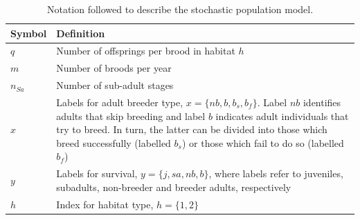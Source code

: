 \begin{table}
\caption[Notation]{Notation followed to describe the stochastic population model.}\label{tab:table3.1}
\begin{tabular}[b]{@{}p{1.5cm}p{13cm}@{}}
\toprule
\textbf{Symbol} & \textbf{Definition}                                                                                                                                                                                                                                                                                        \\ \midrule
$q$   & Number of offsprings per brood in habitat $h$                                                                                                                                                                                                                                                                        \\
$m$   & Number of broods per year                                                                                                                                                                                                                                                                                            \\
${n}_{Sa}$        & Number of sub-adult stages                                                                                                                                                                                                                                                                               \\
$x$   & Labels for adult breeder type, $x= \{nb, b, b_{s}, b_{f}\}$. Label $nb$ identifies adults that skip breeding and label $b$ indicates adult individuals that try to breed. In turn, the latter can be divided into those which breed successfully (labelled $b_{s}$) or those which fail to do so (labelled $b_{f}$)  \\
$y$   & Labels for survival, $y= \{j, sa, nb, b\}$, where labels refer to juveniles, subadults, non-breeder and breeder adults, respectively                                                                                                                                                                                 \\
$h$   & Index for habitat type, $h= \{1, 2\}$                                                                                                                                                                                                                                                                                \\

\end{tabular}
\end{table}
